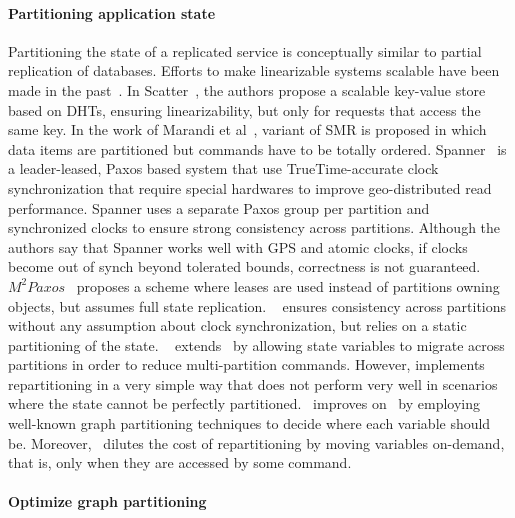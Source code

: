 \paragraph{Partitioning application state}
Partitioning the state of a replicated service is conceptually similar to
partial replication of databases. Efforts to make linearizable systems scalable
have been made in the past~\cite{bezerra2014ssmr, corbett2013spanner,
Glendenning:2011kj, Marandi:2011dj}.  In Scatter~\cite{Glendenning:2011kj}, the
authors propose a scalable key-value store based on DHTs, ensuring
linearizability, but only for requests that access the same key. In the work of
Marandi et al~\cite{Marandi:2011dj}, variant of SMR is proposed in which data
items are partitioned but commands have to be totally ordered.
Spanner~\cite{corbett2013spanner} is a leader-leased, Paxos based system that
use TrueTime-accurate clock synchronization that require special hardwares to
improve geo-distributed read performance. Spanner uses a separate Paxos group
per partition and synchronized clocks to ensure strong consistency across
partitions. Although the authors say that Spanner works well with GPS and atomic
clocks, if clocks become out of synch beyond tolerated bounds, correctness is
not guaranteed. $M^2Paxos$~\cite{7579738} proposes a scheme where leases are
used instead of partitions owning objects, but assumes full state replication.
\ssmr{}~\cite{bezerra2014ssmr} ensures consistency across partitions without any
assumption about clock synchronization, but relies on a static partitioning of
the state. \dssmr{}~\cite{le2016dssmr} extends \ssmr\ by allowing state
variables to migrate across partitions in order to reduce multi-partition
commands. However, \dssmr{} implements repartitioning in a very simple way that
does not perform very well in scenarios where the state cannot be perfectly
partitioned. \dynastar\ improves on \dssmr\ by employing well-known graph
partitioning techniques to decide where each variable should be. Moreover,
\dynastar\ dilutes the cost of repartitioning by moving variables on-demand,
that is, only when they are accessed by some command.

\paragraph{Optimize graph partitioning}

